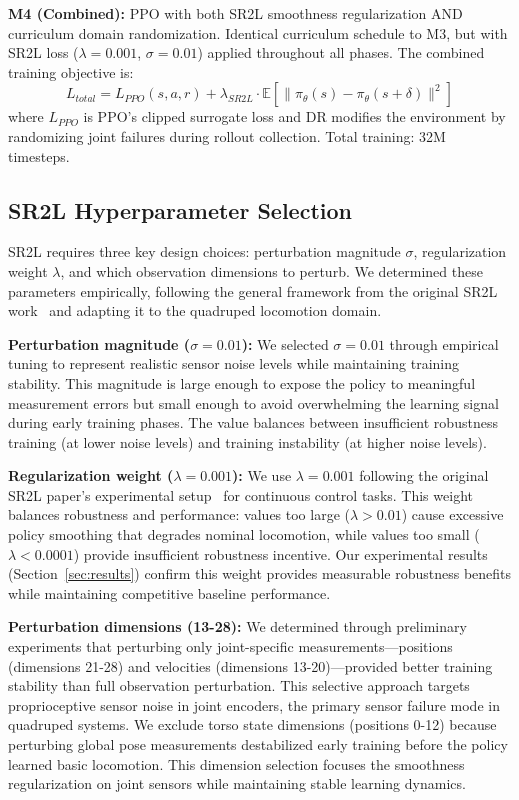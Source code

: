 \documentclass[conference]{IEEEtran}
\begin{document}
\textbf{M4 (Combined):} PPO with both SR2L smoothness regularization AND curriculum domain randomization. Identical curriculum schedule to M3, but with SR2L loss ($\lambda=0.001$, $\sigma=0.01$) applied throughout all phases. The combined training objective is:
\begin{equation}
L_{total} = L_{PPO}(s, a, r) + \lambda_{SR2L} \cdot \mathbb{E}[\|\pi_\theta(s) - \pi_\theta(s+\delta)\|^2]
\end{equation}
where $L_{PPO}$ is PPO's clipped surrogate loss and DR modifies the environment by randomizing joint failures during rollout collection. Total training: 32M timesteps.

\subsection{SR2L Hyperparameter Selection}

SR2L requires three key design choices: perturbation magnitude $\sigma$, regularization weight $\lambda$, and which observation dimensions to perturb. We determined these parameters empirically, following the general framework from the original SR2L work~\cite{shen2020deep} and adapting it to the quadruped locomotion domain.

\textbf{Perturbation magnitude ($\sigma = 0.01$):} We selected $\sigma = 0.01$ through empirical tuning to represent realistic sensor noise levels while maintaining training stability. This magnitude is large enough to expose the policy to meaningful measurement errors but small enough to avoid overwhelming the learning signal during early training phases. The value balances between insufficient robustness training (at lower noise levels) and training instability (at higher noise levels).

\textbf{Regularization weight ($\lambda = 0.001$):} We use $\lambda = 0.001$ following the original SR2L paper's experimental setup~\cite{shen2020deep} for continuous control tasks. This weight balances robustness and performance: values too large ($\lambda > 0.01$) cause excessive policy smoothing that degrades nominal locomotion, while values too small ($\lambda < 0.0001$) provide insufficient robustness incentive. Our experimental results (Section~\ref{sec:results}) confirm this weight provides measurable robustness benefits while maintaining competitive baseline performance.

\textbf{Perturbation dimensions (13-28):} We determined through preliminary experiments that perturbing only joint-specific measurements—positions (dimensions 21-28) and velocities (dimensions 13-20)—provided better training stability than full observation perturbation. This selective approach targets proprioceptive sensor noise in joint encoders, the primary sensor failure mode in quadruped systems. We exclude torso state dimensions (positions 0-12) because perturbing global pose measurements destabilized early training before the policy learned basic locomotion. This dimension selection focuses the smoothness regularization on joint sensors while maintaining stable learning dynamics.
\end{document}
